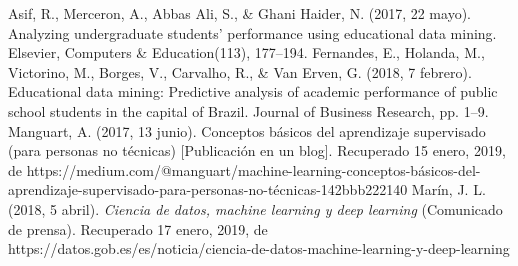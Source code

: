 \documentclass[spanish,12pt, a4paper,twoside]{paper}
\begin{document}
\begin{thebibliography}{00}
 Asif, R., Merceron, A., Abbas Ali, S., \& Ghani Haider, N. (2017, 22 mayo). Analyzing undergraduate students' performance using educational data mining. Elsevier, Computers \& Education(113), 177–194.
Fernandes, E., Holanda, M., Victorino, M., Borges, V., Carvalho, R., \& Van Erven, G. (2018, 7 febrero). Educational data mining: Predictive analysis of academic performance of public school students in the capital of Brazil. Journal of Business Research, pp. 1–9.
Manguart, A. (2017, 13 junio). Conceptos básicos del aprendizaje supervisado (para personas no técnicas) [Publicación en un blog]. Recuperado 15 enero, 2019, de https://medium.com/@manguart/machine-learning-conceptos-básicos-del-aprendizaje-supervisado-para-personas-no-técnicas-142bbb222140
 Marín, J. L. (2018, 5 abril). \emph{Ciencia de datos, machine learning y deep learning} (Comunicado de prensa). Recuperado 17 enero, 2019, de https://datos.gob.es/es/noticia/ciencia-de-datos-machine-learning-y-deep-learning

\end{thebibliography}
\end{document}
